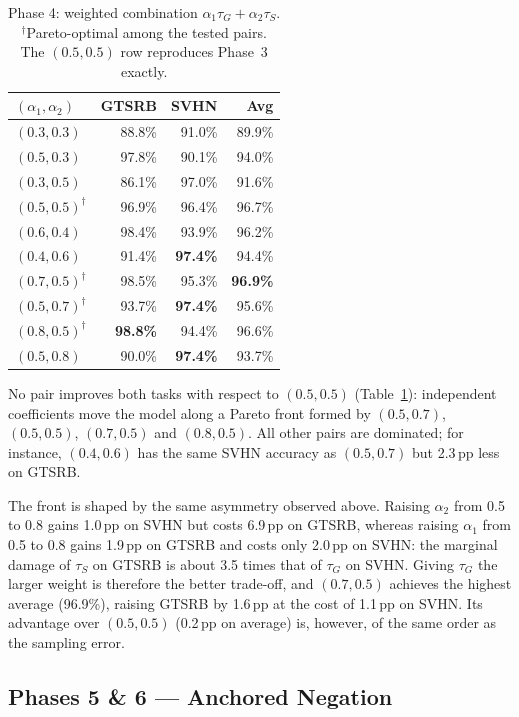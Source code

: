 \documentclass[11pt,a4paper,twocolumn]{article}
\newcommand{\tG}{\tau_G}
\newcommand{\tS}{\tau_S}
\newcommand{\pp}{\,pp}
\begin{document}
\begin{table}[t]
\centering\small
\begin{tabular}{@{}lrrr@{}}
\toprule
$(\alpha_1,\alpha_2)$ & GTSRB & SVHN & Avg \\
\midrule
$(0.3, 0.3)$ & 88.8\% & 91.0\% & 89.9\% \\
$(0.5, 0.3)$ & 97.8\% & 90.1\% & 94.0\% \\
$(0.3, 0.5)$ & 86.1\% & 97.0\% & 91.6\% \\
$(0.5, 0.5)^\dagger$ & 96.9\% & 96.4\% & 96.7\% \\
$(0.6, 0.4)$ & 98.4\% & 93.9\% & 96.2\% \\
$(0.4, 0.6)$ & 91.4\% & \textbf{97.4\%} & 94.4\% \\
$(0.7, 0.5)^\dagger$ & 98.5\% & 95.3\% & \textbf{96.9\%} \\
$(0.5, 0.7)^\dagger$ & 93.7\% & \textbf{97.4\%} & 95.6\% \\
$(0.8, 0.5)^\dagger$ & \textbf{98.8\%} & 94.4\% & 96.6\% \\
$(0.5, 0.8)$ & 90.0\% & \textbf{97.4\%} & 93.7\% \\
\bottomrule
\end{tabular}
\caption{Phase 4: weighted combination $\alpha_1\tG+\alpha_2\tS$.
$^\dagger$Pareto-optimal among the tested pairs. The $(0.5,0.5)$ row
reproduces Phase~3 exactly.}
\label{tab:phase4}
\end{table}

No pair improves both tasks with respect to $(0.5,0.5)$
(Table~\ref{tab:phase4}): independent coefficients move the model along a
Pareto front formed by $(0.5,0.7)$, $(0.5,0.5)$, $(0.7,0.5)$ and
$(0.8,0.5)$. All other pairs are dominated; for instance, $(0.4,0.6)$ has
the same SVHN accuracy as $(0.5,0.7)$ but 2.3\pp{} less on GTSRB.

The front is shaped by the same asymmetry observed above. Raising
$\alpha_2$ from 0.5 to 0.8 gains 1.0\pp{} on SVHN but costs 6.9\pp{} on
GTSRB, whereas raising $\alpha_1$ from 0.5 to 0.8 gains 1.9\pp{} on GTSRB
and costs only 2.0\pp{} on SVHN: the marginal damage of $\tS$ on GTSRB is
about 3.5 times that of $\tG$ on SVHN. Giving $\tG$ the larger weight is
therefore the better trade-off, and $(0.7,0.5)$ achieves the highest
average (96.9\%), raising GTSRB by 1.6\pp{} at the cost of 1.1\pp{} on
SVHN. Its advantage over $(0.5,0.5)$ (0.2\pp{} on average) is, however,
of the same order as the sampling error.

\subsection{Phases 5 \& 6 --- Anchored Negation}
\end{document}
